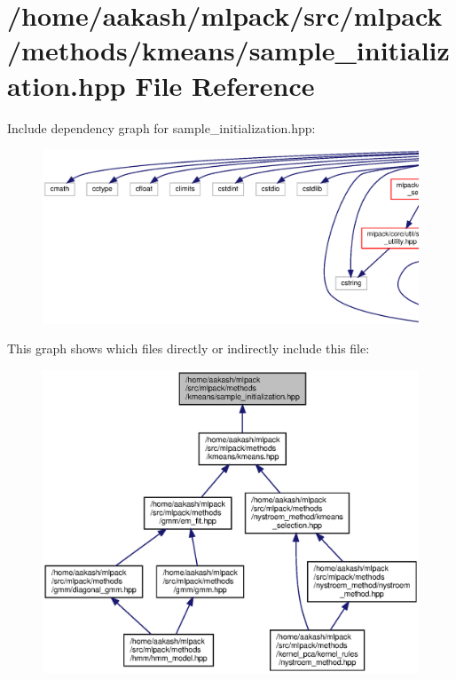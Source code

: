 \section{/home/aakash/mlpack/src/mlpack/methods/kmeans/sample\+\_\+initialization.hpp File Reference}
\label{sample__initialization_8hpp}
Include dependency graph for sample\+\_\+initialization.\+hpp\+:
\nopagebreak
\begin{figure}[H]
\begin{center}
\leavevmode
\includegraphics[width=350pt]{sample__initialization_8hpp__incl}
\end{center}
\end{figure}
This graph shows which files directly or indirectly include this file\+:
\nopagebreak
\begin{figure}[H]
\begin{center}
\leavevmode
\includegraphics[width=350pt]{sample__initialization_8hpp__dep__incl}
\end{center}
\end{figure}

